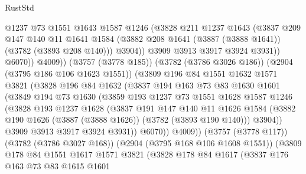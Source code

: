 \begin{lexlean}{RustStd}
\begin{coremodule}
                      @1237
                      @73
                      @1551
                      @1643
                      @1587
                      @1246
                      (@3828
                        @211
                        @1237
                        @1643
                        (@3837
                          @209
                          @147
                          @140
                          @11
                          @1641
                          @1584
                          (@3882 @208 @1641 (@3887 (@3888 @1641)) (@3782 (@3893 @208 @140)))
                          @3904))
                      @3909
                      @3913
                      @3917
                      @3924
                      @3931))
                  @6070))
              @4009))
          (@3757 (@3778 @185))
          (@3782 (@3786 @3026 @186))
          (@2904 (@3795 @186 @106 @1623 @1551))
          (@3809
            @196
            @84
            @1551
            @1632
            @1571
            @3821
            (@3828
              @196
              @84
              @1632
              (@3837
                @194
                @163
                @73
                @83
                @1630
                @1601
                (@3849
                  @194
                  @73
                  @1630
                  (@3859
                    @193
                    @1237
                    @73
                    @1551
                    @1628
                    @1587
                    @1246
                    (@3828
                      @193
                      @1237
                      @1628
                      (@3837
                        @191
                        @147
                        @140
                        @11
                        @1626
                        @1584
                        (@3882 @190 @1626 (@3887 (@3888 @1626)) (@3782 (@3893 @190 @140)))
                        @3904))
                    @3909
                    @3913
                    @3917
                    @3924
                    @3931))
                @6070))
            @4009))
        (@3757 (@3778 @117))
        (@3782 (@3786 @3027 @168))
        (@2904 (@3795 @168 @106 @1608 @1551))
        (@3809
          @178
          @84
          @1551
          @1617
          @1571
          @3821
          (@3828
            @178
            @84
            @1617
            (@3837
              @176
              @163
              @73
              @83
              @1615
              @1601

\end{coremodule}
\end{lexlean}

